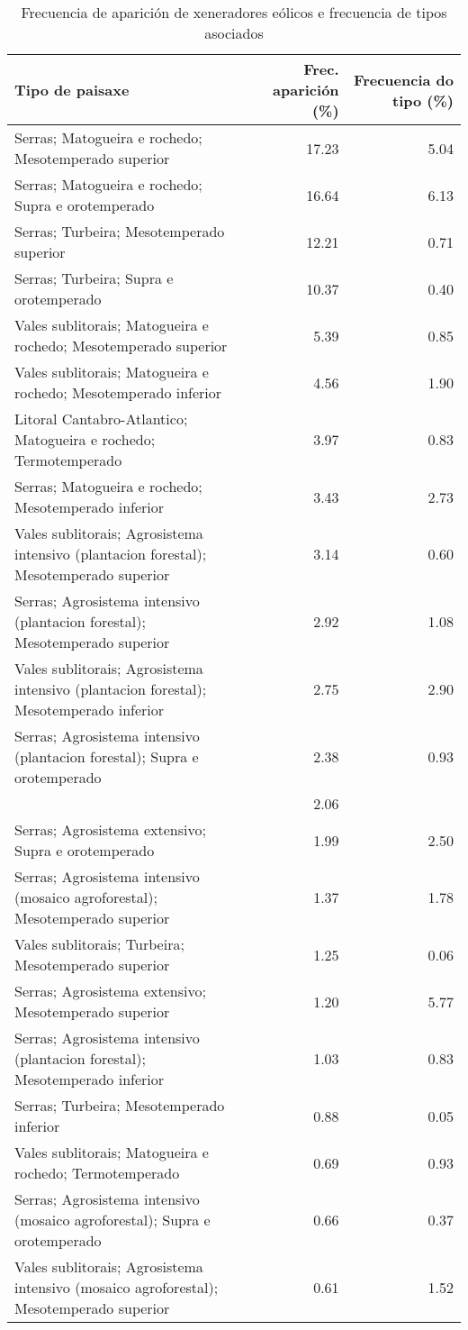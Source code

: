 \begin{table}[p]
\centering
\caption{Frecuencia de aparición de xeneradores eólicos e frecuencia de tipos asociados} 
\label{veolico}
\begin{tabular}{lrr}
  \hline
Tipo de paisaxe & Frec. aparición (\%) & Frecuencia do tipo (\%) \\ 
  \hline
Serras; Matogueira e rochedo; Mesotemperado superior & 17.23 & 5.04 \\ 
  Serras; Matogueira e rochedo; Supra e orotemperado & 16.64 & 6.13 \\ 
  Serras; Turbeira; Mesotemperado superior & 12.21 & 0.71 \\ 
  Serras; Turbeira; Supra e orotemperado & 10.37 & 0.40 \\ 
  Vales sublitorais; Matogueira e rochedo; Mesotemperado superior & 5.39 & 0.85 \\ 
  Vales sublitorais; Matogueira e rochedo; Mesotemperado inferior & 4.56 & 1.90 \\ 
  Litoral Cantabro-Atlantico; Matogueira e rochedo; Termotemperado & 3.97 & 0.83 \\ 
  Serras; Matogueira e rochedo; Mesotemperado inferior & 3.43 & 2.73 \\ 
  Vales sublitorais; Agrosistema intensivo (plantacion forestal); Mesotemperado superior & 3.14 & 0.60 \\ 
  Serras; Agrosistema intensivo (plantacion forestal); Mesotemperado superior & 2.92 & 1.08 \\ 
  Vales sublitorais; Agrosistema intensivo (plantacion forestal); Mesotemperado inferior & 2.75 & 2.90 \\ 
  Serras; Agrosistema intensivo (plantacion forestal); Supra e orotemperado & 2.38 & 0.93 \\ 
   & 2.06 &  \\ 
  Serras; Agrosistema extensivo; Supra e orotemperado & 1.99 & 2.50 \\ 
  Serras; Agrosistema intensivo (mosaico agroforestal); Mesotemperado superior & 1.37 & 1.78 \\ 
  Vales sublitorais; Turbeira; Mesotemperado superior & 1.25 & 0.06 \\ 
  Serras; Agrosistema extensivo; Mesotemperado superior & 1.20 & 5.77 \\ 
  Serras; Agrosistema intensivo (plantacion forestal); Mesotemperado inferior & 1.03 & 0.83 \\ 
  Serras; Turbeira; Mesotemperado inferior & 0.88 & 0.05 \\ 
  Vales sublitorais; Matogueira e rochedo; Termotemperado & 0.69 & 0.93 \\ 
  Serras; Agrosistema intensivo (mosaico agroforestal); Supra e orotemperado & 0.66 & 0.37 \\ 
  Vales sublitorais; Agrosistema intensivo (mosaico agroforestal); Mesotemperado superior & 0.61 & 1.52 \\ 
   \hline
\end{tabular}
\end{table}
